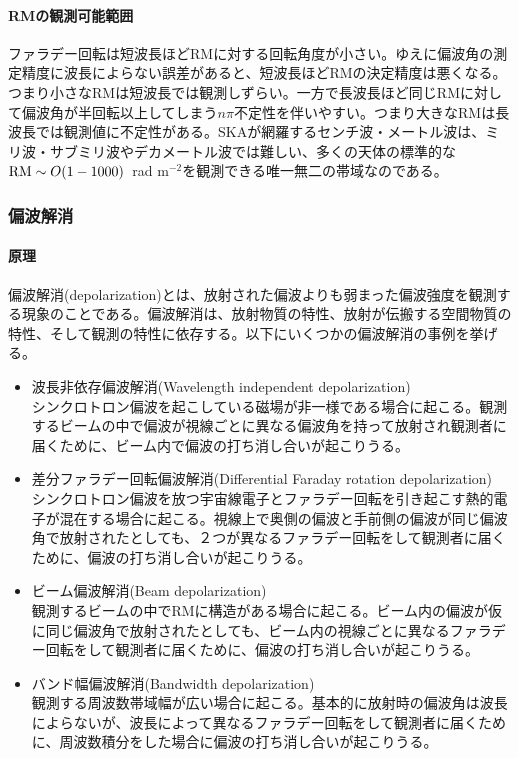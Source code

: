 \paragraph{RMの観測可能範囲}

ファラデー回転は短波長ほどRMに対する回転角度が小さい。ゆえに偏波角の測定精度に波長によらない誤差があると、短波長ほどRMの決定精度は悪くなる。つまり小さなRMは短波長では観測しずらい。一方で長波長ほど同じRMに対して偏波角が半回転以上してしまう$n\pi$不定性を伴いやすい。つまり大きなRMは長波長では観測値に不定性がある。SKAが網羅するセンチ波・メートル波は、ミリ波・サブミリ波やデカメートル波では難しい、多くの天体の標準的な${\rm RM} \sim O(1-1000)$~rad m$^{-2}$を観測できる唯一無二の帯域なのである。

\subsubsection{偏波解消}
\label{c06.s1.ss1.sss3}

\paragraph{原理}

偏波解消(depolarization)とは、放射された偏波よりも弱まった偏波強度を観測する現象のことである。偏波解消は、放射物質の特性、放射が伝搬する空間物質の特性、そして観測の特性に依存する。以下にいくつかの偏波解消の事例を挙げる。
\begin{itemize}
\item 波長非依存偏波解消(Wavelength independent depolarization)\\
シンクロトロン偏波を起こしている磁場が非一様である場合に起こる。観測するビームの中で偏波が視線ごとに異なる偏波角を持って放射され観測者に届くために、ビーム内で偏波の打ち消し合いが起こりうる。
\item 差分ファラデー回転偏波解消(Differential Faraday rotation depolarization)\\
シンクロトロン偏波を放つ宇宙線電子とファラデー回転を引き起こす熱的電子が混在する場合に起こる。視線上で奥側の偏波と手前側の偏波が同じ偏波角で放射されたとしても、２つが異なるファラデー回転をして観測者に届くために、偏波の打ち消し合いが起こりうる。
\item ビーム偏波解消(Beam depolarization)\\
観測するビームの中でRMに構造がある場合に起こる。ビーム内の偏波が仮に同じ偏波角で放射されたとしても、ビーム内の視線ごとに異なるファラデー回転をして観測者に届くために、偏波の打ち消し合いが起こりうる。
\item バンド幅偏波解消(Bandwidth depolarization)\\
観測する周波数帯域幅が広い場合に起こる。基本的に放射時の偏波角は波長によらないが、波長によって異なるファラデー回転をして観測者に届くために、周波数積分をした場合に偏波の打ち消し合いが起こりうる。
\end{itemize}

